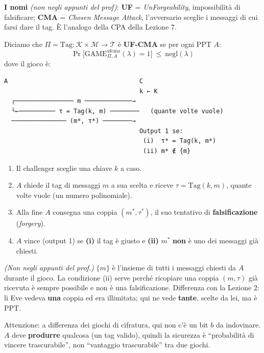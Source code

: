 \textbf{I nomi} \emph{(non negli appunti del prof)}: \textbf{UF} = \emph{UnForgeability}, impossibilità di falsificare; \textbf{CMA} = \emph{Chosen Message Attack}, l'avversario sceglie i messaggi di cui farsi dare il tag. È l'analogo della CPA della Lezione 7.

Diciamo che \(\Pi = \text{Tag} : \mathcal{K} \times \mathcal{M} \to \mathcal{T}\) è \textbf{UF-CMA} se per ogni PPT \(A\):
\[
\Pr\big[\text{GAME}^{\text{ufcma}}_{\Pi, A}(\lambda) = 1\big] \ \le\ \text{negl}(\lambda)
\]
dove il gioco è:

\begin{verbatim}
A                                    C
                                     k ← K
  ┌──────────────── m ─────────────→
  └←────────── τ = Tag(k, m) ────────   (quante volte vuole)
  ─────────────── (m*, τ*) ────────→
                                     Output 1 se:
                                      (i)  τ* = Tag(k, m*)
                                      (ii) m* ∉ {m}
\end{verbatim}

\begin{enumerate}
  \item Il challenger sceglie una chiave \(k\) a caso.
  \item \(A\) chiede il tag di messaggi \(m\) a sua scelta e riceve \(\tau = \text{Tag}(k, m)\), quante volte vuole (un numero polinomiale).
  \item Alla fine \(A\) consegna una coppia \((m^*, \tau^*)\), il suo tentativo di \textbf{falsificazione} (\emph{forgery}).
  \item \(A\) vince (output 1) se \textbf{(i)} il tag è giusto e \textbf{(ii)} \(m^*\) \textbf{non} è uno dei messaggi già chiesti.
\end{enumerate}

\begin{nota}
\emph{(Non negli appunti del prof.)} \(\{m\}\) è l'insieme di tutti i messaggi chiesti da \(A\) durante il gioco. La condizione (ii) serve perché ricopiare una coppia \((m, \tau)\) già ricevuta è sempre possibile e non è una falsificazione. Differenza con la Lezione 2: lì Eve vedeva \textbf{una} coppia ed era illimitata; qui ne vede \textbf{tante}, scelte da lei, ma è PPT.

Attenzione: a differenza dei giochi di cifratura, qui non c'è un bit \(b\) da indovinare. \(A\) deve \textbf{produrre} qualcosa (un tag valido), quindi la sicurezza è ``probabilità di vincere trascurabile'', non ``vantaggio trascurabile'' tra due giochi.
\end{nota}

